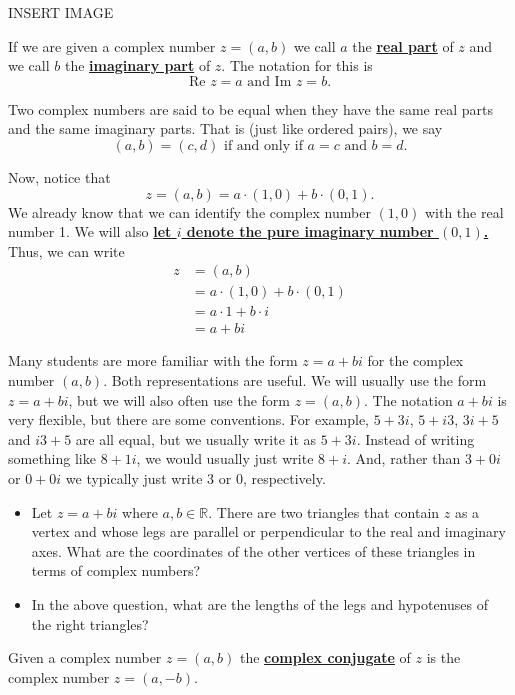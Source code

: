 \documentclass[11pt]{article}
\newenvironment{task}
	{\begin{mdframed}[linecolor=lightgray, linewidth=3pt]\raggedright}
	{\end{mdframed}}
\renewcommand\emph[1]{\underline{\bf{#1}}} %
\theoremstyle{definition}
\begin{document}
\begin{center}
  INSERT IMAGE
\end{center}

If we are given a complex number $z=(a,b)$ we call $a$ the \emph{real part} of $z$ and we call $b$ the \emph{imaginary part} of $z$. The 
notation for this is 
\[ \text{Re }z = a \text{ and } \text{Im }z=b.\]

Two complex numbers are said to be equal when they have the same real parts and the same imaginary parts. That is (just like ordered pairs), we say
\[ (a,b) = (c,d) \text{ if and only if } a=c \text{ and } b=d. \]

Now, notice that
\[ z = (a,b) = a \cdot (1,0) + b \cdot (0,1). \]
We already know that we can identify the complex number $(1,0)$ with the real number 1. We will also \emph{let $i$ denote the pure imaginary number $(0,1)$.}
Thus, we can write
\begin{align*}
 z &= (a,b)\\ 
   &= a \cdot (1,0) + b \cdot (0,1)\\
   &= a\cdot 1 + b\cdot i\\
   &= a + bi
\end{align*}

Many students are more familiar with the form $z = a + bi$ for the complex number $(a,b)$. Both representations are useful. We will usually
use the form $z = a+bi$, but we will also often use the form $z=(a,b)$. The notation $a+bi$ is very flexible, but there are some conventions. For example,
$5+3i$, $5+i3$, $3i+5$ and $i3+5$ are all equal, but we usually write it as $5+3i$. Instead of writing something like $8+1i$, we would usually 
just write $8+i$. And, rather than $3+0i$ or $0+0i$ we typically just write $3$ or $0$, respectively.

\begin{task}
  \begin{itemize}
    \item Let $z=a+bi$ where $a,b\in \mathbb{R}$. There are two triangles that contain $z$ as a vertex and whose legs are parallel or perpendicular to the real and imaginary
  axes. What are the coordinates of the other vertices of these triangles in terms of complex numbers?
  \item In the above question, what are the lengths of the legs and hypotenuses of the right triangles?
  \end{itemize}
\end{task}

Given a complex number $z=(a,b)$ the \emph{complex conjugate} of $z$ is the complex number $z=(a,-b)$.
\end{document}
